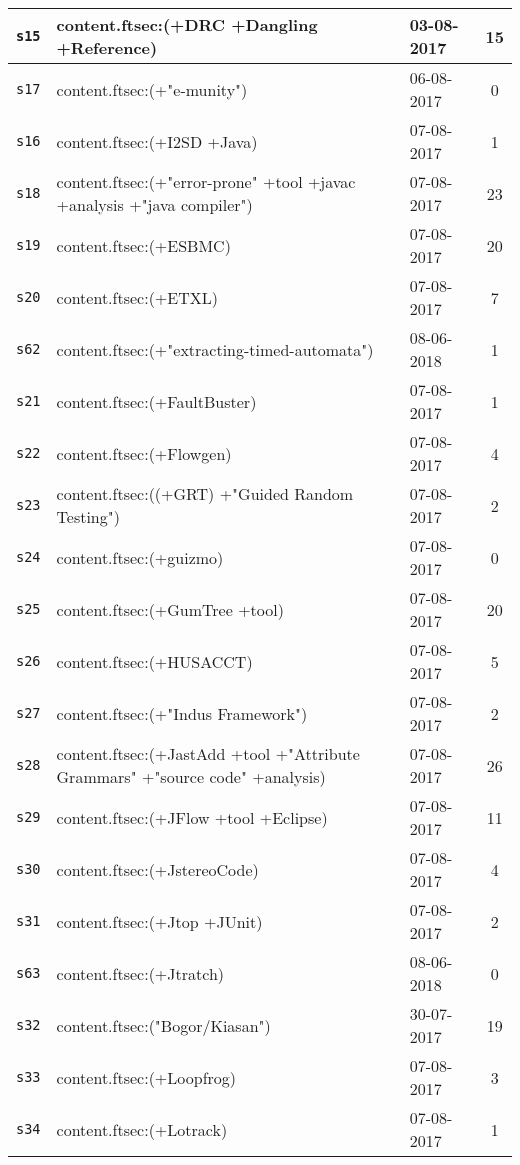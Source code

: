 \begin{longtable}{| l | p{13cm} | l | c |}
\texttt{s15} & content.ftsec:(+DRC +Dangling +Reference) & 03-08-2017 & 15 \\
    \hline
\texttt{s17} & content.ftsec:(+"e-munity") & 06-08-2017 & 0 \\
    \hline
\texttt{s16} & content.ftsec:(+I2SD +Java) & 07-08-2017 & 1 \\
    \hline
\texttt{s18} & content.ftsec:(+"error-prone" +tool +javac +analysis +"java compiler") & 07-08-2017 & 23 \\
    \hline
\texttt{s19} & content.ftsec:(+ESBMC) & 07-08-2017 & 20 \\
    \hline
\texttt{s20} & content.ftsec:(+ETXL) & 07-08-2017 & 7 \\
    \hline
\texttt{s62} & content.ftsec:(+"extracting-timed-automata") & 08-06-2018 & 1 \\
    \hline
\texttt{s21} & content.ftsec:(+FaultBuster) & 07-08-2017 & 1 \\
    \hline
\texttt{s22} & content.ftsec:(+Flowgen) & 07-08-2017 & 4 \\
    \hline
\texttt{s23} & content.ftsec:((+GRT) +"Guided Random Testing") & 07-08-2017 & 2 \\
    \hline
\texttt{s24} & content.ftsec:(+guizmo) & 07-08-2017 & 0 \\
    \hline
\texttt{s25} & content.ftsec:(+GumTree +tool) & 07-08-2017 & 20 \\
    \hline
\texttt{s26} & content.ftsec:(+HUSACCT) & 07-08-2017 & 5 \\
    \hline
\texttt{s27} & content.ftsec:(+"Indus Framework") & 07-08-2017 & 2 \\
    \hline
\texttt{s28} & content.ftsec:(+JastAdd +tool +"Attribute Grammars" +"source code" +analysis) & 07-08-2017 & 26 \\
    \hline
\texttt{s29} & content.ftsec:(+JFlow +tool +Eclipse) & 07-08-2017 & 11 \\
    \hline
\texttt{s30} & content.ftsec:(+JstereoCode) & 07-08-2017 & 4 \\
    \hline
\texttt{s31} & content.ftsec:(+Jtop +JUnit) & 07-08-2017 & 2 \\
    \hline
\texttt{s63} & content.ftsec:(+Jtratch) & 08-06-2018 & 0 \\
    \hline
\texttt{s32} & content.ftsec:("Bogor/Kiasan") & 30-07-2017 & 19 \\
    \hline
\texttt{s33} & content.ftsec:(+Loopfrog) & 07-08-2017 & 3 \\
    \hline
\texttt{s34} & content.ftsec:(+Lotrack) & 07-08-2017 & 1 \\

\end{longtable}
